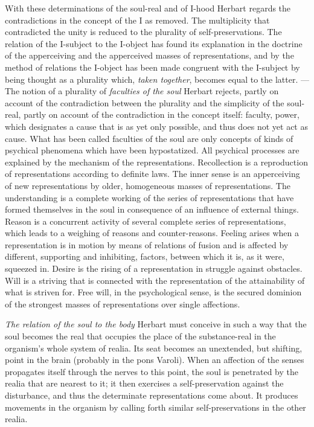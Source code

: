 With these determinations of the soul-real and of I-hood Herbart regards
the contradictions in the concept of the I as removed. The multiplicity
that contradicted the unity is reduced to the plurality of
self-preservations. The relation of the I-subject to the I-object has
found its explanation in the doctrine of the apperceiving and the
apperceived masses of representations, and by the method of relations
the I-object has been made congruent with the I-subject by being thought
as a plurality which, \emph{taken together}, becomes equal to the latter.
--- The notion of a plurality of \emph{faculties of the soul} Herbart
rejects, partly on account of the contradiction between the plurality and
the simplicity of the soul-real, partly on account of the contradiction
in the concept itself: faculty, power, which designates a cause that is
as yet only possible, and thus does not yet act as cause. What has been
called faculties of the soul are only concepts of kinds of psychical
phenomena which have been hypostatized. All psychical processes are
explained by the mechanism of the representations.
Recollection is a reproduction of representations according to definite
laws. The inner sense is an apperceiving of new representations by older,
homogeneous masses of representations. The understanding is a complete
working of the series of representations that have formed themselves in
the soul in consequence of an influence of external things. Reason is a
concurrent activity of several complete series of representations, which
leads to a weighing of reasons and counter-reasons. Feeling arises when a
representation is in motion by means of relations of fusion and is
affected by different, supporting and inhibiting, factors, between which
it is, as it were, squeezed in. Desire is the rising of a representation
in struggle against obstacles. Will is a striving that is connected with
the representation of the attainability of what is striven for. Free
will, in the psychological sense, is the secured dominion of the
strongest masses of representations over single affections.

\emph{The relation of the soul to the body} Herbart must conceive in such
a way that the soul becomes the real that occupies the place of the
substance-real in the organism's whole system of realia. Its seat becomes
an unextended, but shifting, point in the brain (probably in the pons
Varoli). When an affection of the senses propagates itself through the
nerves to this point, the soul is penetrated by the realia that are
nearest to it; it then exercises a self-preservation against the
disturbance, and thus the determinate representations come about. It
produces movements in the organism by calling forth similar
self-preservations in the other realia.

